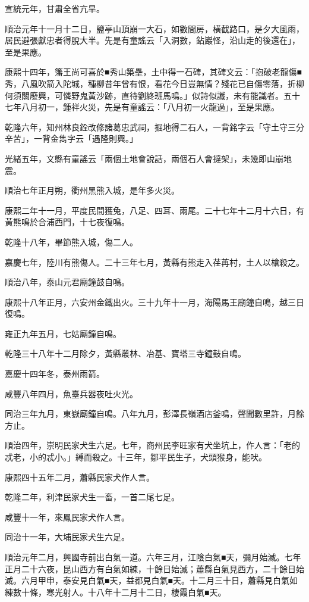 \begin{pinyinscope}
宣統元年，甘肅全省亢旱。

順治元年十一月十二日，鹽亭山頂崩一大石，如數間房，橫截路口，是夕大風雨，居民避張獻忠者得脫大半。先是有童謠云「入洞數，鉆巖怪，沿山走的後還在」，至是果應。

康熙十四年，籓王尚可喜於■秀山築壘，土中得一石碑，其碑文云：「抱破老龍傷■秀，八風吹箭入陀城，種柳昔年曾有恨，看花今日豈無情？殘花已自傷零落，折柳何須關廢興，可憐野鬼黃沙跡，直待劉終班馬鳴。」似詩似讖，未有能識者。五十七年八月初一，鍾祥火災，先是有童謠云：「八月初一火龍過」，至是果應。

乾隆六年，知州林良銓改修諸葛忠武祠，掘地得二石人，一背銘字云「守土守三分辛苦」，一背金雋字云「遇隆則興。」

光緒五年，文縣有童謠云「兩個土地會說話，兩個石人會撻架」，未幾即山崩地震。

順治七年正月朔，衢州黑熊入城，是年多火災。

康熙二年十一月，平度民間獲兔，八足、四耳、兩尾。二十七年十二月十六日，有黃熊鳴於合浦西門，十七夜復鳴。

乾隆十八年，畢節熊入城，傷二人。

嘉慶七年，陸川有熊傷人。二十三年七月，黃縣有熊走入荏苒村，土人以槍殺之。

順治八年，泰山元君廟鐘鼓自鳴。

康熙十八年正月，六安州金鐵出火。三十九年十一月，海陽馬王廟鐘自鳴，越三日復鳴。

雍正九年五月，七姑廟鐘自鳴。

乾隆三十八年十二月除夕，黃縣叢林、冶基、寶塔三寺鐘鼓自鳴。

嘉慶十四年冬，泰州雨箭。

咸豐八年四月，魚臺兵器夜吐火光。

同治三年九月，東嶽廟鐘自鳴。八年九月，彭澤長嶺酒店釜鳴，聲聞數里許，月餘方止。

順治四年，崇明民家犬生六足。七年，商州民李旺家有犬坐坑上，作人言：「老的忒老，小的忒小。」縛而殺之。十三年，鄒平民生子，犬頭猴身，能吠。

康熙四十五年二月，蕭縣民家犬作人言。

乾隆二年，利津民家犬生一畜，一首二尾七足。

咸豐十一年，來鳳民家犬作人言。

同治十一年，大埔民家犬生六足。

順治元年二月，興國寺前出白氣一道。六年三月，江陰白氣■天，彌月始滅。七年正月二十六夜，昆山西方有白氣如練，十餘日始滅；蕭縣白氣見西方，二十餘日始滅。六月甲申，泰安見白氣■天，益都見白氣■天。十二月三十日，蕭縣見白氣如練數十條，寒光射人。十八年十二月十二日，棲霞白氣■天。


\end{pinyinscope}
